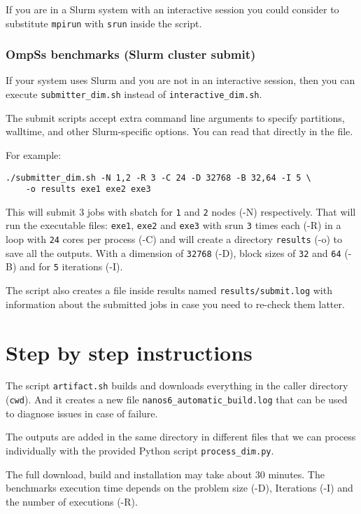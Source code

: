 \documentclass{article}
\newcommand{\code}[1]{\texttt{#1}}
\begin{document}
If you are in a Slurm system with an interactive session you could
consider to substitute \code{mpirun} with \code{srun} inside the
script.

\subsubsection{OmpSs benchmarks (Slurm cluster submit)}\label{SUBMIT}

If your system uses Slurm and you are not in an interactive session,
then you can execute \code{submitter\_dim.sh} instead of
\code{interactive\_dim.sh}.

The submit scripts accept extra command line arguments to specify
partitions, walltime, and other Slurm-specific options. You can read
that directly in the file.

For example:

\begin{lstlisting}
./submitter_dim.sh -N 1,2 -R 3 -C 24 -D 32768 -B 32,64 -I 5 \
	-o results exe1 exe2 exe3
\end{lstlisting}

This will submit 3 jobs with sbatch for \code{1} and \code{2} nodes
(-N) respectively. That will run the executable files: \code{exe1},
\code{exe2} and \code{exe3} with srun \code{3} times each (-R) in a
loop with \code{24} cores per process (-C) and will create a directory
\code{results} (-o) to save all the outputs. With a dimension of
\code{32768} (-D), block sizes of \code{32} and \code{64} (-B) and for
\code{5} iterations (-I).

The script also creates a file inside results named
\code{results/submit.log} with information about the submitted jobs in
case you need to re-check them latter.

\section{Step by step instructions}\label{SBS}

The script \code{artifact.sh} builds and downloads everything in the
caller directory (\code{cwd}). And it creates a new file
\code{nanos6\_automatic\_build.log} that can be used to diagnose
issues in case of failure.

The outputs are added in the same directory in different files that we
can process individually with the provided Python script
\code{process\_dim.py}.

The full download, build and installation may take about 30
minutes. The benchmarks execution time depends on the problem size
(-D), Iterations (-I) and the number of executions (-R).
\end{document}
